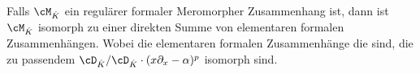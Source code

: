 \begin{exmp}
\begin{comment}
\paragraph{anders geschrieben}
\begin{align*}
P &= x(x\partial_x)^2+x\partial_x+\frac{1}{2}\\
  &= xx\partial_xx\partial_x+x\partial_x+\frac{1}{2}\\
  &= x^2(x\partial_x+1)\partial_x+x\partial_x+\frac{1}{2}\\
  &= x^3\partial_x^2+x^2\partial_x+x\partial_x+\frac{1}{2}\\
  &= x^3\partial_x^2+(x^2+x)\partial_x+\frac{1}{2}\\
\end{align*}
So sieht das Newton-Polygon
wie folgt aus
\begin{figure}[H]
\caption{Newton Polygon zu $P$}
\begin{center}
\fbox{
  \begin{tikzpicture}[scale=1.5,descr/.style={fill=white,inner sep=2.5pt}]
  \def\myPoints{0/0,1/0,1/1,2/1}
  \def\myPath{ -- (1,0) -- node[descr]{$1$} (2,1)}
  \myPlotFunction{\myPoints}{\myPath}{2}{0}{1}{$N(P)$}
  \end{tikzpicture}
}
\end{center}
\end{figure}
\end{comment}
\end{exmp}

\begin{cor}
\cite[Cor 5.2.6]{sabbah_cimpa90}
Falls $\cM_{\hat K}$ ein regulärer formaler Meromorpher Zusammenhang ist, dann
ist $\cM_{\hat K}$ isomorph zu einer direkten Summe von elementaren formalen
Zusammenhängen. Wobei die elementaren formalen Zusammenhänge die sind, die zu
passendem $\cD_{\hat K}/\cD_{\hat K}\cdot(x\partial_x-\alpha)^p$ isomorph
sind.
\end{cor}

